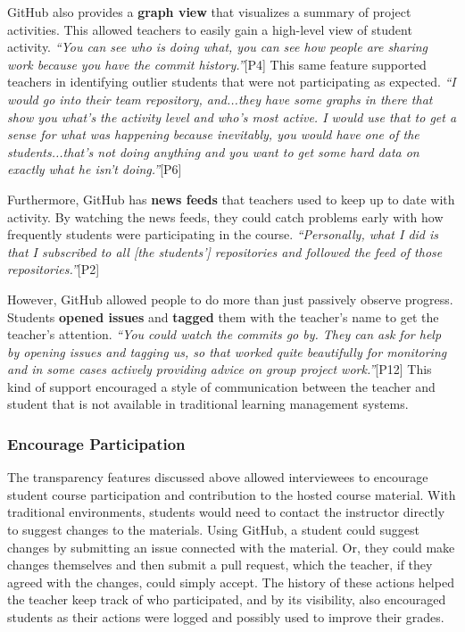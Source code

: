 GitHub also provides a \textbf{graph view} that visualizes a summary of project activities. This allowed teachers to easily gain a high-level view of student activity. \textit{``You can see who is doing what, you can see how people are sharing work because you have the commit history.''}[P4] This same feature supported teachers in identifying outlier students that were not participating as expected. \textit{``I would go into their team repository, and...they have some graphs in there that show you what's the activity level and who's most active. I would use that to get a sense for what was happening because inevitably, you would have one of the students...that's not doing anything and you want to get some hard data on exactly what he isn't doing.''}[P6]

Furthermore, GitHub has \textbf{news feeds} that teachers used to keep up to date with activity. By watching the news feeds, they could catch problems early with how frequently students were participating in the course. \textit{``Personally, what I did is that I subscribed to all [the students'] repositories and followed the feed of those repositories.''}[P2]

However, GitHub allowed people to do more than just passively observe progress. Students \textbf{opened issues} and \textbf{tagged} them with the teacher's name to get the teacher's attention. \textit{``You could watch the commits go by. They can ask for help by opening issues and tagging us, so that worked quite beautifully for monitoring and in some cases actively providing advice on group project work.''}[P12] This kind of support encouraged a style of communication between the teacher and student that is not available in traditional learning management systems.

\subsubsection{Encourage Participation}
The transparency features discussed above allowed interviewees to encourage student course participation and contribution to the hosted course material. With traditional environments, students would need to contact the instructor directly to suggest changes to the materials. Using GitHub, a student could suggest changes by submitting an issue connected with the material. Or, they could make changes themselves and then submit a pull request, which the teacher, if they agreed with the changes, could simply accept. The history of these actions helped the teacher keep track of who participated, and by its visibility, also encouraged students as their actions were logged and possibly used to improve their grades.

